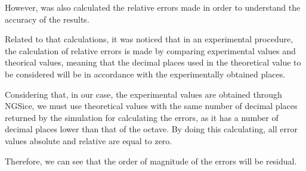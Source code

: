 However, was also calculated the relative errors made in order to understand the accuracy of the results. 

Related to that calculations, it was noticed that in an experimental procedure, the calculation of relative errors is made by comparing experimental values and theorical values, meaning that the decimal places used in the theoretical value to be considered will be in accordance with the experimentally obtained places.


Considering that, in our case, the experimental values are obtained through NGSice, we must use theoretical values with the same number of decimal places returned by the simulation for calculating the errors, as it has a number of decimal places lower than that of the octave. By doing this calculating, all error values absolute and relative are equal to zero. 

Therefore, we can see that the order of magnitude of the errors will be residual.




